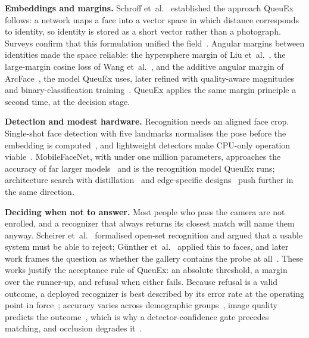 \documentclass{research}
\newcommand{\sysname}{QueuEx}
\begin{document}
\textbf{Embeddings and margins.} Schroff et~al.~\cite{schroff2015facenet}
established the approach \sysname{} follows: a network maps a face into
a vector space in which distance corresponds to identity, so identity is
stored as a short vector rather than a photograph. Surveys confirm that
this formulation unified the field~\cite{wang2021deepfacesurvey,facesurvey2022}.
Angular margins between identities made the space reliable: the
hypersphere margin of Liu et~al.~\cite{liu2017sphereface}, the
large-margin cosine loss of Wang et~al.~\cite{wang2018cosface}, and the
additive angular margin of ArcFace~\cite{deng2019arcface}, the model
\sysname{} uses, later refined with quality-aware
magnitudes~\cite{meng2021magface} and binary-classification
training~\cite{wen2021sphereface2}. \sysname{} applies the same margin
principle a second time, at the decision stage.

\textbf{Detection and modest hardware.} Recognition needs an aligned
face crop. Single-shot face detection with five landmarks normalises the
pose before the embedding is computed~\cite{deng2020retinaface}, and
lightweight detectors make CPU-only operation
viable~\cite{embeddedfacedetect2025}. MobileFaceNet, with under one
million parameters, approaches the accuracy of far larger
models~\cite{chen2018mobilefacenets} and is the recognition model
\sysname{} runs; architecture search with
distillation~\cite{pocketnet2022} and edge-specific
designs~\cite{edgeface2024} push further in the same direction.

\textbf{Deciding when not to answer.} Most people who pass the camera
are not enrolled, and a recognizer that always returns its closest match
will name them anyway. Scheirer et~al.~\cite{scheirer2013openset}
formalised open-set recognition and argued that a usable system must be
able to reject; Günther et~al.~\cite{gunther2017opensetface} applied this
to faces, and later work frames the question as whether the gallery
contains the probe at all~\cite{indexofmax2020}. These works justify the
acceptance rule of \sysname{}: an absolute threshold, a margin over the
runner-up, and refusal when either fails. Because refusal is a valid
outcome, a deployed recognizer is best described by its error rate at
the operating point in force~\cite{operatingpoint2026}; accuracy varies
across demographic groups~\cite{grother2019frvt}, image quality predicts
the outcome~\cite{terhorst2020serfiq,boutros2023crfiqa}, which is why a
detector-confidence gate precedes matching, and occlusion degrades
it~\cite{maskedreview2025}.
\end{document}
